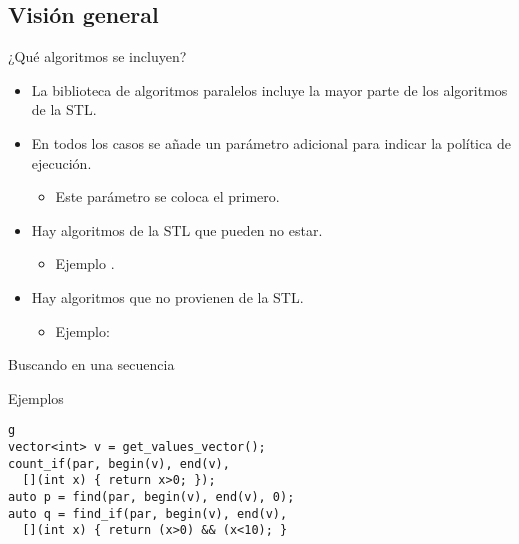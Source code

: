\subsection{Visión general}

\begin{frame}[t]{¿Qué algoritmos se incluyen?}
\begin{itemize}
  \item La biblioteca de algoritmos paralelos incluye la mayor parte
        de los algoritmos de la STL.
  \item En todos los casos se añade un parámetro adicional para indicar
        la política de ejecución.
    \begin{itemize}
      \item Este parámetro se coloca el primero.
    \end{itemize}
  \item Hay algoritmos de la STL que pueden no estar.
    \begin{itemize}
      \item Ejemplo .
    \end{itemize}
  \item Hay algoritmos que no provienen de la STL.
    \begin{itemize}
      \item Ejemplo: 
    \end{itemize}
\end{itemize}
\end{frame}

\begin{frame}[t,fragile]{Buscando en una secuencia}
\begin{block}{Ejemplos}
\begin{lstlisting}g
vector<int> v = get_values_vector();
count_if(par, begin(v), end(v), 
  [](int x) { return x>0; });
auto p = find(par, begin(v), end(v), 0);
auto q = find_if(par, begin(v), end(v),
  [](int x) { return (x>0) && (x<10); }
\end{lstlisting}
\end{block}
\end{frame}

